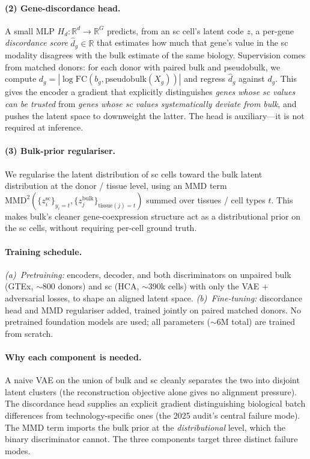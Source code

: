 \documentclass[11pt]{article}
\begin{document}
\paragraph{(2) Gene-discordance head.}
A small MLP $H_d : \mathbb{R}^{d} \to \mathbb{R}^{G}$ predicts, from an sc
cell's latent code $z$, a per-gene \emph{discordance score}
$\hat d_g \in \mathbb{R}$ that estimates how much that gene's value in the sc
modality disagrees with the bulk estimate of the same biology. Supervision
comes from matched donors: for each donor with paired bulk and pseudobulk, we
compute $d_{g} = |\log\mathrm{FC}(b_{g}, \mathrm{pseudobulk}(X_{g}))|$ and
regress $\hat d_g$ against $d_g$. This gives the encoder a gradient that
explicitly distinguishes \emph{genes whose sc values can be trusted} from
\emph{genes whose sc values systematically deviate from bulk}, and pushes the
latent space to downweight the latter. The head is auxiliary---it is not
required at inference.

\paragraph{(3) Bulk-prior regulariser.}
We regularise the latent distribution of sc cells toward the bulk latent
distribution at the donor / tissue level, using an MMD term
$\mathrm{MMD}^{2}\!\left(\{z^{\mathrm{sc}}_{i}\}_{y_i = t}, \{z^{\mathrm{bulk}}_{j}\}_{\mathrm{tissue}(j)=t}\right)$
summed over tissues / cell types $t$. This makes bulk's cleaner
gene-coexpression structure act as a distributional prior on the sc cells,
without requiring per-cell ground truth.

\paragraph{Training schedule.}
\emph{(a)~Pretraining:} encoders, decoder, and both discriminators on
unpaired bulk (GTEx, $\sim$800 donors) and sc (HCA, $\sim$390k cells) with
only the VAE + adversarial losses, to shape an aligned latent space.
\emph{(b)~Fine-tuning:} discordance head and MMD regulariser added, trained
jointly on paired matched donors. No pretrained foundation models are used;
all parameters ($\sim$6M total) are trained from scratch.

\paragraph{Why each component is needed.}
A naive VAE on the union of bulk and sc cleanly separates the two into
disjoint latent clusters (the reconstruction objective alone gives no
alignment pressure). The discordance head supplies an explicit gradient
distinguishing biological batch differences from technology-specific ones
(the 2025 audit's central failure mode). The MMD term imports the bulk
prior at the \emph{distributional} level, which the binary discriminator
cannot. The three components target three distinct failure modes.
\end{document}
